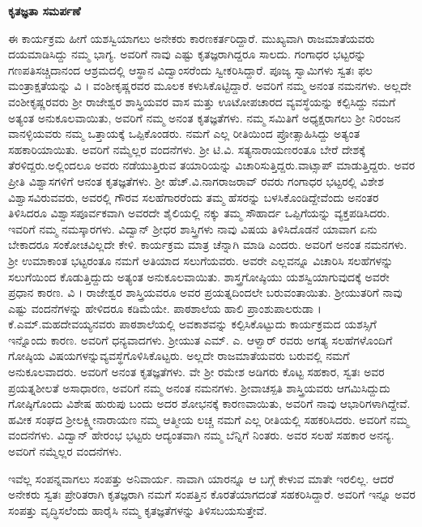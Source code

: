 {{\large \textbf{ಕೃತಜ್ಞತಾ ಸಮರ್ಪಣೆ \enginline{-}}}

ಈ ಕಾರ್ಯಕ್ರಮ ಹೀಗೆ ಯಶಸ್ವಿಯಾಗಲು  ಅನೇಕರು ಕಾರಣಕರ್ತರಿದ್ದಾರೆ. ಮುಖ್ಯವಾಗಿ ರಾಜಮಾತೆಯವರು ದಯಮಾಡಿಸಿದ್ದು ನಮ್ಮ ಭಾಗ್ಯ. ಅವರಿಗೆ ನಾವು ಎಷ್ಟು ಕೃತಜ್ಞರಾಗಿದ್ದರೂ ಸಾಲದು. ಗಂಗಾಧರ ಭಟ್ಟರನ್ನು ಗಣಪತಿಸಚ್ಚಿದಾನಂದ ಆಶ್ರಮ\-ದಲ್ಲಿ ಆಸ್ಥಾನ ವಿದ್ವಾಂಸರೆಂದು ಸ್ವೀಕರಿಸಿದ್ದಾರೆ. ಪೂಜ್ಯ ಸ್ವಾಮಿಗಳು ಸ್ವತಃ ಫಲ ಮಂತ್ರಾಕ್ಷತೆಯನ್ನು ವಿ । ವಂಶೀಕೃಷ್ಣರವರ ಮೂಲಕ ಕಳುಸಿಕೊಟ್ಟಿದ್ದಾರೆ. ಅವರಿಗೆ ನಮ್ಮ ಅನಂತ ನಮನಗಳು. ಅಲ್ಲದೇ ವಂಶೀಕೃಷ್ಣರವರು  ಶ್ರೀ ರಾಜೇಶ್ವರ ಶಾಸ್ತ್ರಿಯವರ ವಾಸ ಮತ್ತು ಊಟೋಪಚಾರದ ವ್ಯವಸ್ಥೆಯನ್ನು ಕಲ್ಪಿಸಿದ್ದು ನಮಗೆ ಅತ್ಯಂತ ಅನುಕೂಲ\-ವಾಯಿತು, ಅವರಿಗೆ ನಮ್ಮ ಅನಂತ ಕೃತಜ್ಞತೆಗಳು. ನಮ್ಮ ಸಮಿತಿಗೆ ಅಧ್ಯಕ್ಷರಾಗಲು ಶ್ರೀ ನಿರಂಜನ ವಾನಳ್ಳಿಯವರು ನಮ್ಮ ಒತ್ತಾಯಕ್ಕೆ ಒಪ್ಪಿಕೊಂಡರು.  ನಮಗೆ ಎಲ್ಲ ರೀತಿಯಿಂದ ಪ್ರೋತ್ಸಾಹಿಸಿದ್ದು ಅತ್ಯಂತ ಸಹಕಾರಿಯಾಯಿತು. ಅವರಿಗೆ ನಮ್ಮೆಲ್ಲರ ವಂದನೆಗಳು. ಶ್ರೀ ಟಿ.ವಿ. ಸತ್ಯನಾರಾಯಣರಂತೂ ಬೇರೆ ದೇಶಕ್ಕೆ ತೆರಳಿದ್ದರು.\break ಅಲ್ಲಿಂದಲೂ ಅವರು ನಡೆಯುತ್ತಿರುವ ತಯಾರಿಯನ್ನು ವಿಚಾರಿಸುತ್ತಿದ್ದರು.\break ವಾಟ್ಸಾಪ್ ಮಾಡುತ್ತಿದ್ದರು.  ಅವರ ಪ್ರೀತಿ ವಿಶ್ವಾಸಗಳಿಗೆ ಆನಂತ ಕೃತಜ್ಞತೆಗಳು. ಶ್ರೀ ಹೆಚ್.ವಿ.ನಾಗರಾಜರಾವ್ ರವರು ಗಂಗಾಧರ ಭಟ್ಟರಲ್ಲಿ ವಿಶೇಶ ವಿಶ್ವಾಸವಿರುವವರು, ಅವರಲ್ಲಿ ಗೌರವ ಸಲಹೆಗಾರರೆಂದು ತಮ್ಮ ಹೆಸರನ್ನು ಬಳಸಿಕೊಂಡಿದ್ದೇವೆಂದು ಅನಂತರ ತಿಳಿಸಿದರೂ ವಿಶ್ವಾಸಪೂರ್ವಕವಾಗಿ ಅವರದೇ ಶೈಲಿಯಲ್ಲಿ ನಕ್ಕು ತಮ್ಮ ಸೌಹಾರ್ದ ಒಪ್ಪಿಗೆಯನ್ನು ವ್ಯಕ್ತಪಡಿಸಿದರು. ಇವರಿಗೆ ನಮ್ಮ ನಮಸ್ಕಾರಗಳು. ವಿದ್ವಾನ್ ಶ್ರೀಧರ ಶಾಸ್ತ್ರಿಗಳು ನಾವು ವಿಷಯ ತಿಳಿಸಿದೊಡನೆ ಯಾವಾಗ ಏನು ಬೇಕಾದರೂ ಸಂಕೋಚವಿಲ್ಲದೇ ಕೇಳಿ. ಕಾರ್ಯಕ್ರಮ ಮಾತ್ರ ಚೆನ್ನಾಗಿ ಮಾಡಿ ಎಂದರು. ಅವರಿಗೆ ಅನಂತ ನಮನ\-ಗಳು. ಶ್ರೀ ಉಮಾಕಾಂತ ಭಟ್ಟರಂತೂ ನಮಗೆ ಅತಿಯಾದ ಸಲುಗೆಯವರು. ಅವರೇ ಎಲ್ಲವನ್ನೂ ವಿಚಾರಿಸಿ ಸಲಹೆಗಳನ್ನು ಸಲುಗೆಯಿಂದ ಕೊಡುತ್ತಿದ್ದುದು ಅತ್ಯಂತ ಅನುಕೂಲ\-ವಾಯಿತು. ಶಾಸ್ತ್ರಗೋಷ್ಠಿಯು ಯಶಸ್ವಿಯಾಗುವುದಕ್ಕೆ ಅವರೇ ಪ್ರಧಾನ ಕಾರಣ. ವಿ । ರಾಜೇಶ್ವರ ಶಾಸ್ತ್ರಿಯವರೂ ಅವರ ಪ್ರಯತ್ನದಿಂದಲೇ ಬರುವಂತಾಯಿತು. ಶ್ರೀಯುತರಿಗೆ ನಾವು ಎಷ್ಟು ವಂದನೆಗಳನ್ನು ಹೇಳಿದರೂ ಕಡಿಮೆಯೇ. ಪಾಠಶಾಲೆಯ ಹಾಲಿ ಪ್ರಾಂಶುಪಾಲರು\break ಡಾ । ಕೆ.ಎಮ್.ಮಹದೇವಯ್ಯನವರು ಪಾಠಶಾಲೆಯಲ್ಲಿ ಅವಕಾಶವನ್ನು ಕಲ್ಪಿಸಿ\-ಕೊಟ್ಟುದು ಕಾರ್ಯಕ್ರಮದ ಯಶಸ್ಸಿಗೆ ಇನ್ನೊಂದು ಕಾರಣ. ಅವರಿಗೆ ಧನ್ಯವಾದಗಳು. ಶ್ರೀಯುತ ಎಮ್. ಎ. ಆಳ್ವಾರ್ ರವರು ಅಗತ್ಯ ಸಲಹೆಗಳೊಂದಿಗೆ ಗೋಷ್ಠಿಯ ವಿಷಯಗಳನ್ನು\break ವ್ಯವಸ್ಥೆಗೊಳಿಸಿಕೊಟ್ಟರು. ಅಲ್ಲದೇ ರಾಜಮಾತೆಯವರು ಬರುವಲ್ಲಿ ನಮಗೆ ಅನುಕೂಲವಾದರು. ಅವರಿಗೆ ಅನಂತ ಕೃತಜ್ಞತೆಗಳು. ವೇ ಶ್ರೀ ರಮೇಶ ಅಡಿಗರು ಕೊಟ್ಟ ಸಹಕಾರ, ಸ್ವತಃ ಅವರ ಪ್ರಯತ್ನಶೀಲತೆ ಅಸಾಧಾರಣ, ಅವರಿಗೆ ನಮ್ಮ ಅನಂತ ನಮನಗಳು.  ಶ್ರೀವಾಚಸ್ಪತಿ ಶಾಸ್ತ್ರಿಯವರು  ಆಗಮಿಸಿದ್ದುದು ಗೋಷ್ಠಿಗೊಂದು ವಿಶೇಷ ಹುರುಪು ಬಂದು ಅದರ  ಶೋಭನಕ್ಕೆ ಕಾರಣವಾಯಿತು, ಅವರಿಗೆ ನಾವು ಆಭಾರಿಗಳಾಗಿದ್ದೇವೆ. ಹವೀಕ ಸಂಘದ ಶ್ರೀಲಕ್ಷ್ಮೀನಾರಾಯಣ ನಮ್ಮ ಆತ್ಮೀಯ ಲಚ್ಚ ನಮಗೆ ಎಲ್ಲ ರೀತಿಯಲ್ಲಿ ಸಹಕರಿಸಿದರು. ಅವರಿಗೆ ನಮ್ಮ ವಂದನೆಗಳು. ವಿದ್ವಾನ್ ಹೇರಂಭ ಭಟ್ಟರು ಆದ್ಯಂತವಾಗಿ ನಮ್ಮ ಬೆನ್ನಿಗೆ ನಿಂತರು. ಅವರ ಸಲಹೆ ಸಹಕಾರ ಅನನ್ಯ. ಅವರಿಗೆ ನಮ್ಮೆಲ್ಲರ ವಂದನೆಗಳು. 

ಇವೆಲ್ಲ ಸಂಪನ್ನವಾಗಲು ಸಂಪತ್ತು ಅನಿವಾರ್ಯ. ನಾವಾಗಿ ಯಾರನ್ನೂ ಆ ಬಗ್ಗೆ ಕೇಳುವ ಮಾತೇ ಇರಲಿಲ್ಲ. ಆದರೆ ಅನೇಕರು ಸ್ವತಃ ಪ್ರೇರಿತರಾಗಿ ಕೃತಜ್ಞರಾಗಿ ನಮಗೆ ಸಂಪತ್ತಿನ ಕೊರತೆಯಾಗದಂತೆ ಸಹಕರಿಸಿದ್ದಾರೆ. ಅವರಿಗೆ ಇನ್ನೂ ಅವರ ಸಂಪತ್ತು ವೃದ್ಧಿಸಲೆಂದು ಹಾರೈಸಿ ನಮ್ಮ ಕೃತಜ್ಞತೆಗಳನ್ನು ತಿಳಿಸಬಯಸುತ್ತೇವೆ.

}
